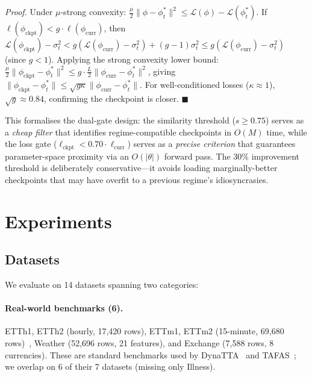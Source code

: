\documentclass[journal]{IEEEtran}
\renewenvironment{proof}[1][Proof]{\noindent\textit{#1.}\space}{\hfill$\blacksquare$\par\medskip}
\begin{document}
\begin{proof}
Under $\mu$-strong convexity: $\frac{\mu}{2}\|\phi - \phi^*_t\|^2 \leq \mathcal{L}(\phi) - \mathcal{L}(\phi^*_t)$. If $\ell(\phi_{\text{ckpt}}) < g \cdot \ell(\phi_{\text{curr}})$, then $\mathcal{L}(\phi_{\text{ckpt}}) - \sigma^2_t < g(\mathcal{L}(\phi_{\text{curr}}) - \sigma^2_t) + (g-1)\sigma^2_t \leq g(\mathcal{L}(\phi_{\text{curr}}) - \sigma^2_t)$ (since $g < 1$). Applying the strong convexity lower bound: $\frac{\mu}{2}\|\phi_{\text{ckpt}} - \phi^*_t\|^2 \leq g \cdot \frac{L}{2}\|\phi_{\text{curr}} - \phi^*_t\|^2$, giving $\|\phi_{\text{ckpt}} - \phi^*_t\| \leq \sqrt{g \kappa} \|\phi_{\text{curr}} - \phi^*_t\|$. For well-conditioned losses ($\kappa \approx 1$), $\sqrt{g} \approx 0.84$, confirming the checkpoint is closer.
\end{proof}

This formalises the dual-gate design: the similarity threshold ($s \geq 0.75$) serves as a \emph{cheap filter} that identifies regime-compatible checkpoints in $O(M)$ time, while the loss gate ($\ell_{\text{ckpt}} < 0.70 \cdot \ell_{\text{curr}}$) serves as a \emph{precise criterion} that guarantees parameter-space proximity via an $O(|\theta|)$ forward pass. The 30\% improvement threshold is deliberately conservative---it avoids loading marginally-better checkpoints that may have overfit to a previous regime's idiosyncrasies.


\section{Experiments}
\label{sec:experiments}

\subsection{Datasets}

We evaluate on 14 datasets spanning two categories:

\paragraph{Real-world benchmarks (6).} ETTh1, ETTh2 (hourly, 17,420 rows), ETTm1, ETTm2 (15-minute, 69,680 rows)~\cite{zhou2021informer}, Weather (52,696 rows, 21 features), and Exchange (7,588 rows, 8 currencies). These are standard benchmarks used by DynaTTA~\cite{grover2025dynatta} and TAFAS~\cite{kim2025tafas}; we overlap on 6 of their 7 datasets (missing only Illness).
\end{document}
